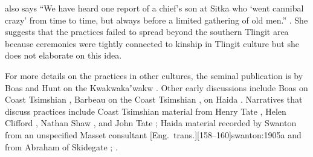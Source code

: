\citeauthor{mcclellan:1954} also says “We have heard one report of a chief’s son at Sitka who ‘went cannibal crazy’ from time to time, but always before a limited gathering of old men.” \parencite[96]{mcclellan:1954}.
She suggests that the  practices failed to spread beyond the southern Tlingit area because ceremonies were tightly connected to kinship in Tlingit culture \parencites[96]{mcclellan:1954}[567]{mcclellan:1975b} but she does not elaborate on this idea.

For more details on the  practices in other cultures, the seminal publication is by Boas and Hunt on the Kwakwakaʼwakw \parencite{boas-hunt:1897}.
Other early discussions include Boas on Coast Tsimshian \parencite[546–558]{boas:1916}, Barbeau on the Coast Tsimshian \parencite[xi–xii]{barbeau-beynon:1987a}, \citeauthor{swanton:1905a} on Haida \parencite[155–181]{swanton:1905a} .
Narratives that discuss  practices include Coast Tsimshian material from Henry Tate
\parencite[350–353, 353–354]{boas:1916}, Helen Clifford \parencite[93–95, 97–99]{barbeau-beynon:1987a}, Nathan Shaw \parencite[5–6, 8–12, 206–208]{barbeau-beynon:1987b}, and John Tate \parencite[206–208]{barbeau-beynon:1987b}; Haida material recorded by Swanton from an unspecified Masset consultant \parencite[793–795]{swanton:1908a}[Eng.\ trans.][158–160]{swanton:1905a} and from Abraham of Skidegate \parencite[425, 429–433, 434–443]{swanton:1905b}; .

